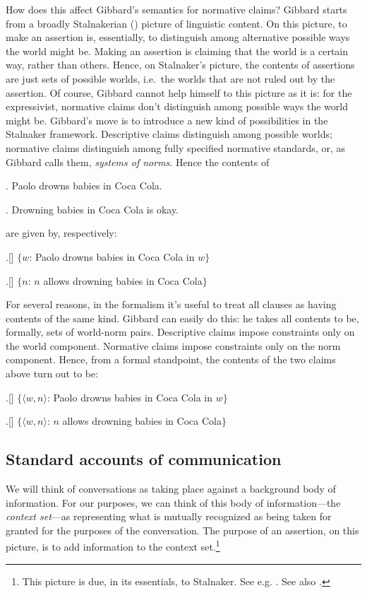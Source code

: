 \documentclass[11pt,article,oneside]{memoir}
\begin{document}
How does this affect Gibbard's semantics for normative claims? Gibbard starts from a broadly Stalnakerian (\citeyear{stalnaker1978}) picture of linguistic content. On this picture, to make an assertion is, essentially, to distinguish among alternative possible ways the world might be. Making an assertion is claiming that the world is a certain way, rather than others. Hence, on Stalnaker's picture, the contents of assertions are just sets of possible worlds, i.e.~the worlds that are not ruled out by the assertion. Of course, Gibbard cannot help himself to this picture as it is: for the expressivist, normative claims don't distinguish among possible ways the world might be. Gibbard's move is to introduce a new kind of possibilities in the Stalnaker framework. Descriptive claims distinguish among possible worlds; normative claims distinguish among fully specified normative standards, or, as Gibbard calls them, \emph{systems of norms}. Hence the contents of 

\ex. Paolo drowns babies in Coca Cola.

\ex. Drowning babies in Coca Cola is okay.

are given by, respectively:

\ex.[] $\lbrace$$w$: Paolo drowns babies in Coca Cola in $w$$\rbrace$

\ex.[] $\lbrace$$n$: $n$ allows drowning babies in Coca Cola$\rbrace$

For several reasons, in the formalism it's useful to treat all clauses as having contents of the same kind. Gibbard can easily do this: he takes all contents to be, formally, sets of world-norm pairs. Descriptive claims impose constraints only on the world component. Normative claims impose constraints only on the norm component. Hence, from a formal standpoint, the contents of the two claims above turn out to be:

\ex.[] $\lbrace$$\langle w, n \rangle$: Paolo drowns babies in Coca Cola in $w$$\rbrace$

\ex.[] $\lbrace$$\langle w, n \rangle$: $n$ allows drowning babies in Coca Cola$\rbrace$


\subsection{Standard accounts of communication}

We will think of conversations as taking place against a background body of information. For our purposes, we can think of this body of information---the \emph{context set}---as representing what is mutually recognized as being taken for granted for the purposes of the conversation. The purpose of an assertion, on this picture, is to add information to the context set.\footnote{This picture is due, in its essentials, to Stalnaker. See  e.g. \citealt{stalnaker1973,stalnaker1978}. See also \citealt{lewis1979a}.}
\end{document}
